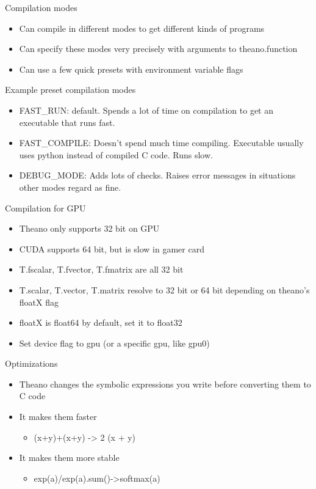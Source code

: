 \documentclass[utf8x,xcolor=pdftex,dvipsnames,table]{beamer}
\begin{document}
\begin{frame}{Compilation modes}  
  \begin{itemize}
  \item Can compile in different modes to get different kinds of programs
  \item Can specify these modes very precisely with arguments to theano.function
  \item Can use a few quick presets with environment variable flags
  \end{itemize}
\end{frame}

\begin{frame}{Example preset compilation modes}
  \begin{itemize}
  \item FAST\_RUN: default. Spends a lot of time on
compilation to get an executable that runs
fast.
  \item FAST\_COMPILE: Doesn’t spend much time
compiling. Executable usually uses python
instead of compiled C code. Runs slow.
  \item DEBUG\_MODE: Adds lots of checks.
Raises error messages in situations other
modes regard as fine.
  \end{itemize}
\end{frame}

\begin{frame}{Compilation for GPU}
  \begin{itemize}
  \item Theano only supports 32 bit on GPU
  \item CUDA supports 64 bit, but is slow in gamer card
  \item T.fscalar, T.fvector, T.fmatrix are all 32 bit
  \item T.scalar, T.vector, T.matrix resolve to 32 bit or 64 bit depending on theano’s floatX flag
  \item floatX is float64 by default, set it to float32
  \item Set device flag to gpu (or a specific gpu, like gpu0)
  \end{itemize}
\end{frame}

\begin{frame}{Optimizations}
  \begin{itemize}
  \item Theano changes the symbolic expressions
    you write before converting them to C code
  \item It makes them faster
  \begin{itemize}
  \item (x+y)+(x+y) -> 2 (x + y)
  \end{itemize}
  \item It makes them more stable
  \begin{itemize}
  \item exp(a)/exp(a).sum()->softmax(a)
  \end{itemize}
  \end{itemize}
\end{frame}
\end{document}
